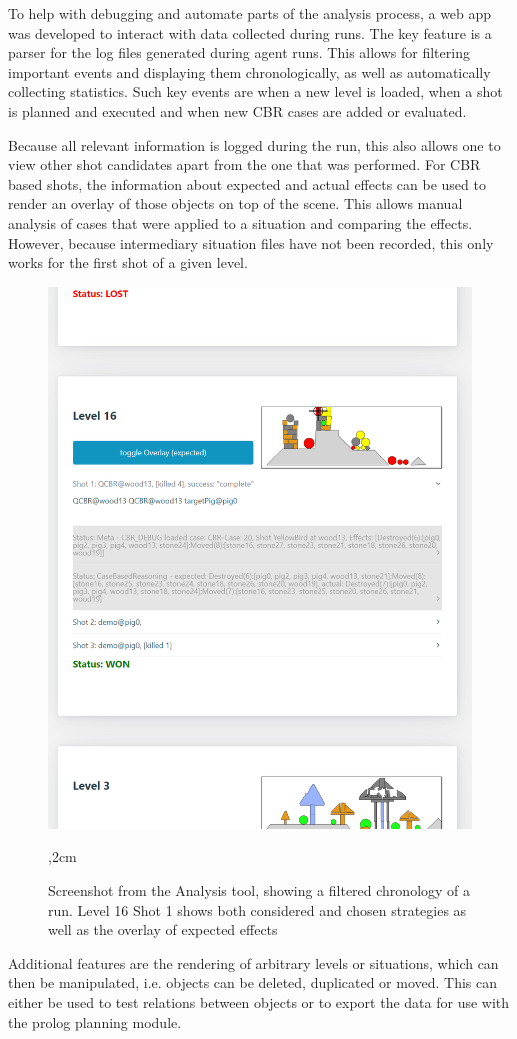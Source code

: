 To help with debugging and automate parts of the analysis process, a web app was developed to interact with data collected during runs.
The key feature is a parser for the log files generated during agent runs. This allows for filtering important events and displaying them chronologically, as well as automatically collecting statistics.
Such key events are when a new level is loaded, when a shot is planned and executed and when new \ac{CBR} cases are added or evaluated.

Because all relevant information is logged during the run, this also allows one to view other shot candidates apart from the one that was performed.
For \ac{CBR} based shots, the information about expected and actual effects can be used to render an overlay of those objects on top of the scene.
This allows manual analysis of cases that were applied to a situation and comparing the effects.
However, because intermediary situation files have not been recorded, this only works for the first shot of a given level.

\begin{figure}[H]%
    \begin{center}%
        \includegraphics[width=15cm]{data/run_analysis2}%
        \vskip -0.3cm%
        \caption{Screenshot from the Analysis tool, showing a filtered chronology of a run. Level 16 Shot 1 shows both considered and chosen strategies as well as the overlay of expected effects}%
        ,2cm%
        \label{fig:run-analysis}%
    \end{center}%
\end{figure}%

Additional features are the rendering of arbitrary levels or situations, which can then be manipulated, i.e. objects can be deleted, duplicated or moved.
This can either be used to test relations between objects or to export the data for use with the prolog planning module.
